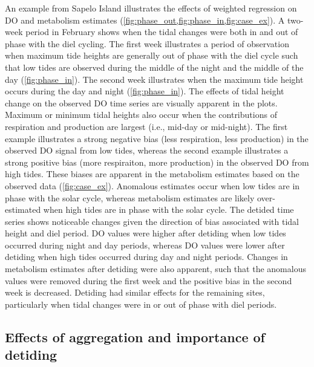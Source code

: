 \documentclass[letterpaper,12pt,oneside]{article}\usepackage[]{graphicx}\usepackage[]{color}
\begin{document}
An example from Sapelo Island illustrates the effects of weighted regression on \ac{DO} and metabolism estimates (\cref{fig:phase_out,fig:phase_in,fig:case_ex}).   A two-week period in February shows when the tidal changes were both in and out of phase with the diel cycling.  The first week illustrates a period of observation when maximum tide heights are generally out of phase with the diel cycle such that low tides are observed during the middle of the night and the middle of the day (\cref{fig:phase_in}).  The second week illustrates when the maximum tide height occurs during the day and night (\cref{fig:phase_in}).  The effects of tidal height change on the observed \ac{DO} time series are visually apparent in the plots.  Maximum or minimum tidal heights also occur when the contributions of respiration and production are largest (i.e., mid-day or mid-night). The first example illustrates a strong negative bias (less respiration, less production) in the observed \ac{DO} signal from low tides, whereas the second example illustrates a strong positive bias (more respiraiton, more production) in the observed \ac{DO} from high tides. These biases are apparent in the metabolism estimates based on the observed data (\cref{fig:case_ex}).  Anomalous estimates occur when low tides are in phase with the solar cycle, whereas metabolism estimates are likely over-estimated when high tides are in phase with the solar cycle.  The detided time series shows noticeable changes given the direction of bias associated with tidal height and diel period.  \ac{DO} values were higher after detiding when low tides occurred during night and day periods, whereas \ac{DO} values were lower after detiding when high tides occurred during day and night periods.  Changes in metabolism estimates after detiding were also apparent, such that the anomalous values were removed during the first week and the positive bias in the second week is decreased.  Detiding had similar effects for the remaining sites, particularly when tidal changes were in or out of phase with diel periods. 

\subsection{Effects of aggregation and importance of detiding}
\end{document}
